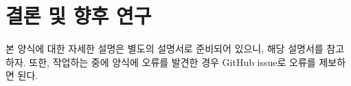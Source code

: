 \section{결론 및 향후 연구}
본 양식에 대한 자세한 설명은 별도의 설명서로 준비되어 있으니, 해당 설명서를 참고하자. 또한, 작업하는 중에 양식에 오류를 발견한 경우 GitHub issue로 오류를 제보하면 된다.
